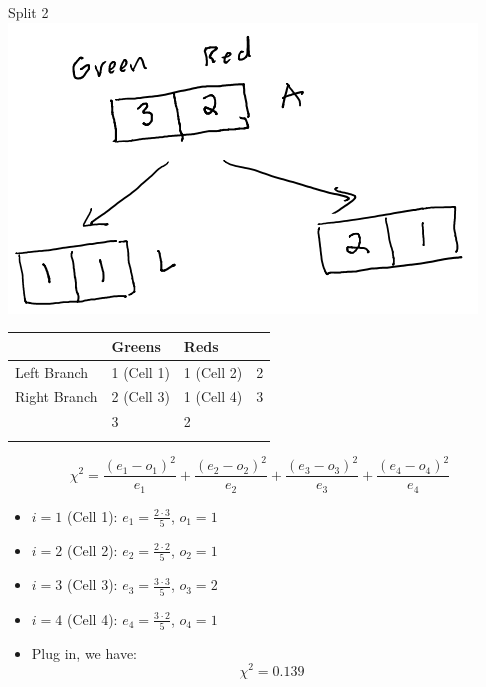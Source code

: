 \documentclass[
  ignorenonframetext,
]{beamer}
\begin{document}
\begin{frame}{Split 2}
\label{split-2}
\includegraphics{images/im3.png}

\begin{longtable}[]{@{}llll@{}}
\toprule\noalign{}
& Greens & Reds & \\
\midrule\noalign{}
\endhead
Left Branch & 1 (Cell 1) & 1 (Cell 2) & 2 \\
Right Branch & 2 (Cell 3) & 1 (Cell 4) & 3 \\
& 3 & 2 & \\
\bottomrule\noalign{}
\end{longtable}

\[\chi^2 = \frac{(e_1-o_1)^2}{e_1}+\frac{(e_2-o_2)^2}{e_2}+\frac{(e_3-o_3)^2}{e_3}+\frac{(e_4-o_4)^2}{e_4}\]

\begin{itemize}
\item
  \(i=1\) (Cell 1): \(e_1 = \frac{2\cdot 3}{5}\), \(o_1 = 1\)
\item
  \(i=2\) (Cell 2): \(e_2 = \frac{2\cdot 2}{5}\), \(o_2 = 1\)
\item
  \(i=3\) (Cell 3): \(e_3 = \frac{3\cdot 3}{5}\), \(o_3 = 2\)
\item
  \(i=4\) (Cell 4): \(e_4 = \frac{3\cdot 2}{5}\), \(o_4 = 1\)
\item
  Plug in, we have: \[\chi^2 = 0.139\]
\end{itemize}
\end{frame}
\end{document}
